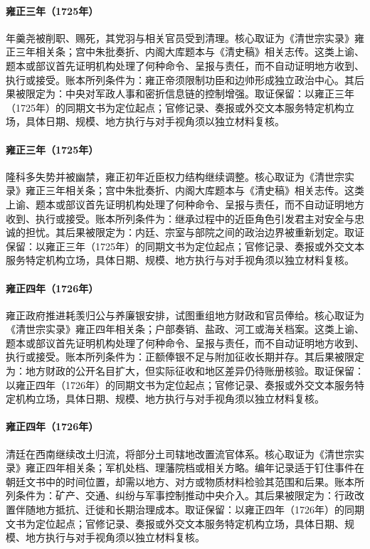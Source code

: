 \hypertarget{ledger:EQ-1725-NIAN-GENGYAO-PUNISHMENT}{}\paragraph{雍正三年（1725年）}年羹尧被削职、赐死，其党羽与相关官员受到清理。核心取证为《清世宗实录》雍正三年相关条；宫中朱批奏折、内阁大库题本与《清史稿》相关志传。这类上谕、题本或部议首先证明机构处理了何种命令、呈报与责任，而不自动证明地方收到、执行或接受。账本所列条件为：雍正帝须限制功臣和边帅形成独立政治中心。其后果被限定为：中央对军政人事和密折信息链的控制增强。取证保留：以雍正三年（1725年）的同期文书为定位起点；官修记录、奏报或外交文本服务特定机构立场，具体日期、规模、地方执行与对手视角须以独立材料复核。
\hypertarget{ledger:EQ-1725-TAN-TEBI-CASE}{}\paragraph{雍正三年（1725年）}隆科多失势并被幽禁，雍正初年近臣权力结构继续调整。核心取证为《清世宗实录》雍正三年相关条；宫中朱批奏折、内阁大库题本与《清史稿》相关志传。这类上谕、题本或部议首先证明机构处理了何种命令、呈报与责任，而不自动证明地方收到、执行或接受。账本所列条件为：继承过程中的近臣角色引发君主对安全与忠诚的担忧。其后果被限定为：内廷、宗室与部院之间的政治边界被重新划定。取证保留：以雍正三年（1725年）的同期文书为定位起点；官修记录、奏报或外交文本服务特定机构立场，具体日期、规模、地方执行与对手视角须以独立材料复核。
\hypertarget{ledger:EQ-1726-HAOXIAN-GUIGONG}{}\paragraph{雍正四年（1726年）}雍正政府推进耗羡归公与养廉银安排，试图重组地方财政和官员俸给。核心取证为《清世宗实录》雍正四年相关条；户部奏销、盐政、河工或海关档案。这类上谕、题本或部议首先证明机构处理了何种命令、呈报与责任，而不自动证明地方收到、执行或接受。账本所列条件为：正额俸银不足与附加征收长期并存。其后果被限定为：地方财政的公开名目扩大，但实际征收和地区差异仍待账册核验。取证保留：以雍正四年（1726年）的同期文书为定位起点；官修记录、奏报或外交文本服务特定机构立场，具体日期、规模、地方执行与对手视角须以独立材料复核。
\hypertarget{ledger:EQ-1726-Gaitu-Guiliu-SOUTHWEST}{}\paragraph{雍正四年（1726年）}清廷在西南继续改土归流，将部分土司辖地改置流官体系。核心取证为《清世宗实录》雍正四年相关条；军机处档、理藩院档或相关方略。编年记录适于钉住事件在朝廷文书中的时间位置，却需以地方、对方或物质材料检验其范围和后果。账本所列条件为：矿产、交通、纠纷与军事控制推动中央介入。其后果被限定为：行政改置伴随地方抵抗、迁徙和长期治理成本。取证保留：以雍正四年（1726年）的同期文书为定位起点；官修记录、奏报或外交文本服务特定机构立场，具体日期、规模、地方执行与对手视角须以独立材料复核。
